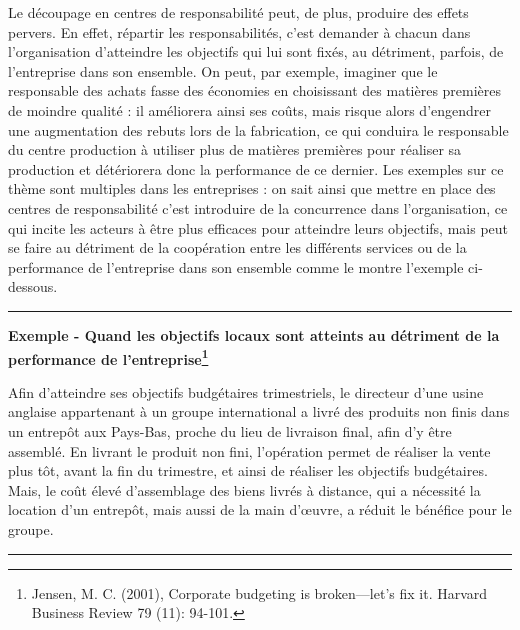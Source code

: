 \documentclass[oneside]{kaobook}
\begin{document}
Le découpage en centres de responsabilité peut, de plus, produire des effets pervers. En effet, répartir les responsabilités, c’est demander à chacun dans l’organisation d’atteindre les objectifs qui lui sont fixés, au détriment, parfois, de l’entreprise dans son ensemble. On peut, par exemple, imaginer que le responsable des achats fasse des économies en choisissant des matières premières de moindre qualité : il améliorera ainsi ses coûts, mais risque alors d’engendrer une augmentation des rebuts lors de la fabrication, ce qui conduira le responsable du centre production à utiliser plus de matières premières pour réaliser sa production et détériorera donc la performance de ce dernier. Les exemples sur ce thème sont multiples dans les entreprises : on sait ainsi que mettre en place des centres de responsabilité c’est introduire de la concurrence dans l’organisation, ce qui incite les acteurs à être plus efficaces pour atteindre leurs objectifs, mais peut se faire au détriment de la coopération entre les différents services ou de la performance de l’entreprise dans son ensemble comme le montre l’exemple ci-dessous.

\noindent\rule{\textwidth}{0.5pt}
\textbf{Exemple - Quand les objectifs locaux sont atteints au détriment de la performance de l’entreprise\footnote{Jensen, M. C. (2001), Corporate budgeting is broken—let's fix it. Harvard Business Review 79 (11): 94-101.}}

Afin d’atteindre ses objectifs budgétaires trimestriels, le directeur d’une usine anglaise appartenant à un groupe international a livré des produits non finis dans un entrepôt aux Pays-Bas, proche du lieu de livraison final, afin d’y être assemblé. En livrant le produit non fini, l’opération permet de réaliser la vente plus tôt, avant la fin du trimestre, et ainsi de réaliser les objectifs budgétaires. Mais, le coût élevé d’assemblage des biens livrés à distance, qui a nécessité la location d’un entrepôt, mais aussi de la main d’œuvre, a réduit le bénéfice pour le groupe.

\noindent\rule{\textwidth}{0.5pt}
\end{document}
